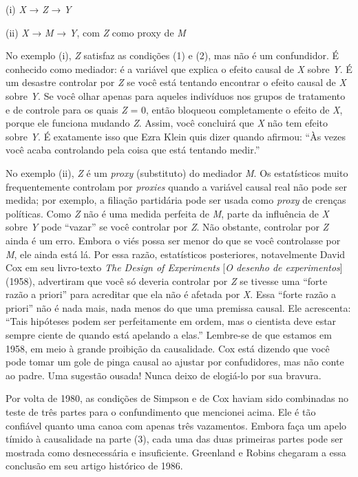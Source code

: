 \documentclass[11pt,a5paper,twoside]{book}
\begin{document}
(i) \textit{X} → \textit{Z} → \textit{Y}

(ii) \textit{X} → \textit{M} → \textit{Y}, com \textit{Z} como proxy de \textit{M}

No exemplo (i), \textit{Z} satisfaz as condições (1) e (2), mas não é um confundidor. É conhecido como mediador: é a variável que explica o efeito causal de \textit{X} sobre \textit{Y}. É um desastre controlar por \textit{Z} se você está tentando encontrar o efeito causal de \textit{X} sobre \textit{Y}. Se você olhar apenas para aqueles indivíduos nos grupos de tratamento e de controle para os quais \textit{Z} = 0, então bloqueou completamente o efeito de \textit{X}, porque ele funciona mudando \textit{Z}. Assim, você concluirá que \textit{X} não tem efeito sobre \textit{Y}. É exatamente isso que Ezra Klein quis dizer quando afirmou: “Às vezes você acaba controlando pela coisa que está tentando medir.”

No exemplo (ii), \textit{Z} é um \textit{proxy} (substituto) do mediador \textit{M}. Os estatísticos muito frequentemente controlam por \textit{proxies} quando a variável causal real não pode ser medida; por exemplo, a filiação partidária pode ser usada como \textit{proxy} de crenças políticas. Como \textit{Z} não é uma medida perfeita de \textit{M}, parte da influência de \textit{X} sobre \textit{Y} pode “vazar” se você controlar por \textit{Z}. Não obstante, controlar por \textit{Z} ainda é um erro. Embora o viés possa ser menor do que se você controlasse por \textit{M}, ele ainda está lá. Por essa razão, estatísticos posteriores, notavelmente David Cox em seu livro-texto \textit{The Design of Experiments} [\textit{O desenho de experimentos}] (1958), advertiram que você só deveria controlar por \textit{Z} se tivesse uma “forte razão a priori” para acreditar que ela não é afetada por \textit{X}. Essa “forte razão a priori” não é nada mais, nada menos do que uma premissa causal. Ele acrescenta: “Tais hipóteses podem ser perfeitamente em ordem, mas o cientista deve estar sempre ciente de quando está apelando a elas.” Lembre-se de que estamos em 1958, em meio à grande proibição da causalidade. Cox está dizendo que você pode tomar um gole de pinga causal ao ajustar por confudidores, mas não conte ao padre. Uma sugestão ousada! Nunca deixo de elogiá-lo por sua bravura.

Por volta de 1980, as condições de Simpson e de Cox haviam sido combinadas no teste de três partes para o confundimento que mencionei acima. Ele é tão confiável quanto uma canoa com apenas três vazamentos. Embora faça um apelo tímido à causalidade na parte (3), cada uma das duas primeiras partes pode ser mostrada como desnecessária e insuficiente. Greenland e Robins chegaram a essa conclusão em seu artigo histórico de 1986.
\end{document}
